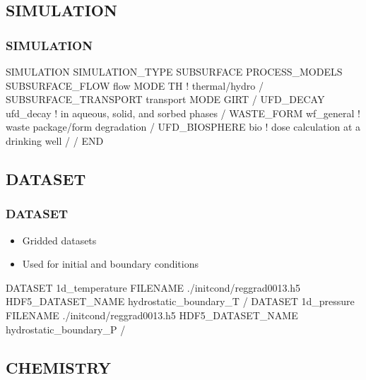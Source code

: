 \documentclass{beamer}
\newcommand\bluecomment[1]{{{\color{blue} #1}}}
\begin{document}
\subsection{SIMULATION}

\begin{frame}[fragile]\frametitle{SIMULATION}

\begin{semiverbatim}\small
SIMULATION
  SIMULATION_TYPE SUBSURFACE
  PROCESS_MODELS
    SUBSURFACE_FLOW flow
      MODE TH \bluecomment{! thermal/hydro}
    /   
    SUBSURFACE_TRANSPORT transport
      MODE GIRT
    /
    UFD_DECAY ufd_decay \bluecomment{! in aqueous, solid, and sorbed phases}
    /
    WASTE_FORM wf_general \bluecomment{! waste package/form degradation}
    /
    UFD_BIOSPHERE bio \bluecomment{! dose calculation at a drinking well}
    /
  /
END
\end{semiverbatim}

\end{frame}

\subsection{DATASET}

\begin{frame}[fragile]\frametitle{DATASET}

\begin{itemize}
  \item Gridded datasets
  \item Used for initial and boundary conditions
\end{itemize}

\begin{semiverbatim}
DATASET 1d_temperature
  FILENAME ./initcond/reggrad0013.h5
  HDF5_DATASET_NAME hydrostatic_boundary_T
/
DATASET 1d_pressure
  FILENAME ./initcond/reggrad0013.h5
  HDF5_DATASET_NAME hydrostatic_boundary_P
/
\end{semiverbatim}

\end{frame}

\subsection{CHEMISTRY}
\end{document}
